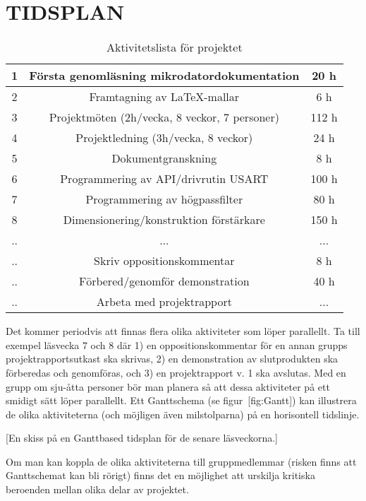 \documentclass[a4paper]{article}
\begin{document}
\section{TIDSPLAN}

\begin{table}[]
    \centering
\begin{tabular}{ |c|c|c| } 
 \hline
 1 & Första genomläsning mikrodatordokumentation & 20 h\\ 
 \hline
 2 & Framtagning av LaTeX-mallar & 6 h \\ 
 \hline
 3 & Projektmöten (2h/vecka, 8 veckor, 7 personer)  & 112 h \\ 
 \hline
 4 & Projektledning (3h/vecka, 8 veckor) & 24 h \\ 
 \hline
 5 & Dokumentgranskning & 8 h \\
 \hline
 6 & Programmering av API/drivrutin USART & 100 h\\ 
 \hline
 7 & Programmering av högpassfilter & 80 h \\ 
 \hline
 8 & Dimensionering/konstruktion förstärkare & 150 h \\ 
 \hline
 .. & ... & ... \\ 
 \hline
 .. & Skriv oppositionskommentar & 8 h \\ 
 \hline
 .. & Förbered/genomför demonstration & 40 h \\
 \hline
 .. & Arbeta med projektrapport & ... \\ 
 \hline
\end{tabular}
\caption{Aktivitetslista för projektet}
\label{Aktivitetslista}
\end{table}


Det kommer periodvis att finnas flera olika aktiviteter som löper
parallellt. Ta till exempel läsvecka 7 och 8 där 1) en
oppositionskommentar för en annan grupps projektrapportsutkast ska
skrivas, 2) en demonstration av slutprodukten ska förberedas och
genomföras, och 3) en projektrapport v. 1 ska avslutas. Med en grupp om
sju-åtta personer bör man planera så att dessa aktiviteter på ett
smidigt sätt löper parallellt. Ett Ganttschema (se figur [fig:Gantt])
kan illustrera de olika aktiviteterna (och möjligen även milstolparna)
på en horisontell tidslinje.

[En skiss på en Ganttbased tidsplan för de senare läsveckorna.]

Om man kan koppla de olika aktiviteterna till gruppmedlemmar (risken
finns att Ganttschemat kan bli rörigt) finns det en möjlighet att
urskilja kritiska beroenden mellan olika delar av projektet.
\end{document}
